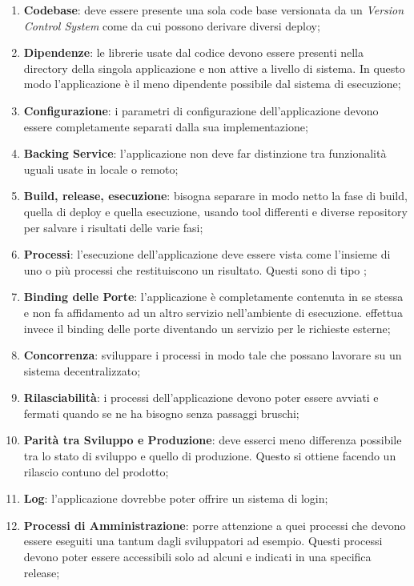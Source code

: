 \begin{enumerate}
	\item \textbf{Codebase}: deve essere presente una sola code base versionata da un \textit{Version Control System} come  da cui possono derivare diversi deploy;
	\item \textbf{Dipendenze}: le librerie usate dal codice devono essere presenti nella directory della singola applicazione e non attive a livello di sistema. In questo modo l'applicazione è il meno dipendente possibile dal sistema di esecuzione;
	\item \textbf{Configurazione}: i parametri di configurazione dell'applicazione devono essere completamente separati dalla sua implementazione;
	\item \textbf{Backing Service}: l'applicazione non deve far distinzione tra funzionalità uguali usate in locale o remoto;
	\item \textbf{Build, release, esecuzione}: bisogna separare in modo netto la fase di build, quella di deploy e quella esecuzione, usando tool differenti e diverse repository per salvare i risultati delle varie fasi;
	\item \textbf{Processi}: l'esecuzione dell'applicazione deve essere vista come l'insieme di uno o più processi che restituiscono un risultato. Questi sono di tipo ;
	\item \textbf{Binding delle Porte}: l'applicazione è completamente contenuta in se stessa e non fa affidamento ad un altro servizio nell'ambiente di esecuzione. effettua invece il binding delle porte diventando un servizio per le richieste esterne;
	\item \textbf{Concorrenza}: sviluppare i processi in modo tale che possano lavorare su un sistema decentralizzato;
	\item \textbf{Rilasciabilità}: i processi dell'applicazione devono poter essere avviati e fermati quando se ne ha bisogno senza passaggi bruschi;
	\item \textbf{Parità tra Sviluppo e Produzione}: deve esserci meno differenza possibile tra lo stato di sviluppo e quello di produzione. Questo si ottiene facendo un rilascio contuno del prodotto;
	\item \textbf{Log}: l'applicazione dovrebbe poter offrire un sistema di login;
	\item \textbf{Processi di Amministrazione}: porre attenzione a quei processi che devono essere eseguiti una tantum dagli sviluppatori ad esempio. Questi processi devono poter essere accessibili solo ad alcuni e indicati in una specifica release;
\end{enumerate}

